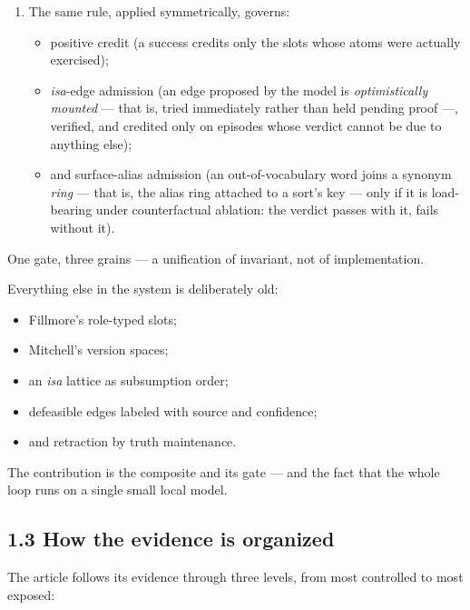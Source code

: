 \documentclass[11pt]{article}
\begin{document}
\begin{enumerate}
\item The same rule, applied symmetrically, governs:
\begin{itemize}
\item positive credit (a success credits only the slots whose atoms were actually exercised);
\item \emph{isa}-edge admission (an edge proposed by the model is \emph{optimistically mounted} — that is, tried immediately rather than held pending proof —, verified, and credited only on episodes whose verdict cannot be due to anything else);
\item and surface-alias admission (an out-of-vocabulary word joins a synonym \emph{ring} — that is, the alias ring attached to a sort's key — only if it is load-bearing under counterfactual ablation: the verdict passes with it, fails without it).

\end{itemize}
\end{enumerate}
One gate, three grains — a unification of invariant, not of implementation.

Everything else in the system is deliberately old:

\begin{itemize}
\item Fillmore's role-typed slots;
\item Mitchell's version spaces;
\item an \emph{isa} lattice as subsumption order;
\item defeasible edges labeled with source and confidence;
\item and retraction by truth maintenance.
\end{itemize}

The contribution is the composite and its gate — and the fact that the whole loop runs on a single small local model.

\subsection*{1.3 How the evidence is organized}

The article follows its evidence through three levels, from most controlled to most exposed:
\end{document}
